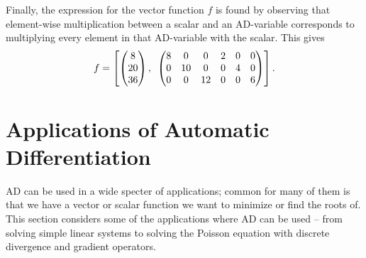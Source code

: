 Finally, the expression for the vector function $f$ is found by observing that element-wise multiplication between a scalar and an AD-variable corresponds to multiplying every element in that AD-variable with the scalar. This gives
\begin{align*}
    f = \left[
        \begin{pmatrix}
        8\\20\\36
        \end{pmatrix}
        ,\hspace{0.5em}
        \begin{pmatrix}
        8&0&0&2&0&0\\
        0&10&0&0&4&0\\
        0&0&12&0&0&6
        \end{pmatrix}
        \right].
\end{align*}
\section{Applications of Automatic Differentiation}
\label{sec:ApplicationsAD}
AD can be used in a wide specter of applications; common for many of them is that we have a vector or scalar function we want to minimize or find the roots of. This section considers some of the applications where AD can be used -- from solving simple linear systems to solving the Poisson equation with discrete divergence and gradient operators.

